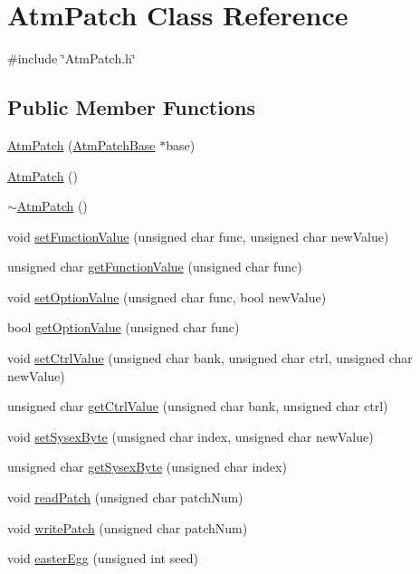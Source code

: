 \hypertarget{class_atm_patch}{}\section{Atm\+Patch Class Reference}
\label{class_atm_patch}


{\ttfamily \#include \char`\"{}Atm\+Patch.\+h\char`\"{}}

\subsection*{Public Member Functions}
\begin{DoxyCompactItemize}
\item 
\hyperlink{class_atm_patch_ad9b5a85c314ca968deae87ca43b087e9}{Atm\+Patch} (\hyperlink{class_atm_patch_base}{Atm\+Patch\+Base} $\ast$base)
\item 
\hyperlink{class_atm_patch_ac9d24dbe3f01ee12145649819017f697}{Atm\+Patch} ()
\item 
\hyperlink{class_atm_patch_ae37c93d358677907afbcc74c34469ba2}{$\sim$\+Atm\+Patch} ()
\item 
void \hyperlink{class_atm_patch_ad2fe7a265755afc95a36752b86b6a7e2}{set\+Function\+Value} (unsigned char func, unsigned char new\+Value)
\item 
unsigned char \hyperlink{class_atm_patch_a7b4184a7f5bd314e150f9ad38cc3a0fb}{get\+Function\+Value} (unsigned char func)
\item 
void \hyperlink{class_atm_patch_a1139606bcbffe63881b3f175f577d8e1}{set\+Option\+Value} (unsigned char func, bool new\+Value)
\item 
bool \hyperlink{class_atm_patch_ab521c0a108bf7f8bc848755c38330bc0}{get\+Option\+Value} (unsigned char func)
\item 
void \hyperlink{class_atm_patch_a95fb3ea0dfd3369abe7518da26edb1b5}{set\+Ctrl\+Value} (unsigned char bank, unsigned char ctrl, unsigned char new\+Value)
\item 
unsigned char \hyperlink{class_atm_patch_a5e8835fb80bdd1f130f129edde447d35}{get\+Ctrl\+Value} (unsigned char bank, unsigned char ctrl)
\item 
void \hyperlink{class_atm_patch_acc2729c3b10aa4d7f98e67caa3b80255}{set\+Sysex\+Byte} (unsigned char index, unsigned char new\+Value)
\item 
unsigned char \hyperlink{class_atm_patch_a48b5b2d71e4b83b80979a68372e935ae}{get\+Sysex\+Byte} (unsigned char index)
\item 
void \hyperlink{class_atm_patch_a9689db39f28d3c7d0fcaa6966c82e2d6}{read\+Patch} (unsigned char patch\+Num)
\item 
void \hyperlink{class_atm_patch_a5814cd528970cb153dd67865a6b86c85}{write\+Patch} (unsigned char patch\+Num)
\item 
void \hyperlink{class_atm_patch_ad7a325c544381189f9419131feba685b}{easter\+Egg} (unsigned int seed)
\end{DoxyCompactItemize}
